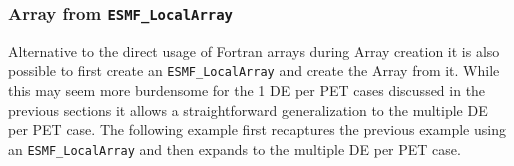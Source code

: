  
\setlength{\oldparskip}{\parskip}
\setlength{\parskip}{1.5ex}
\setlength{\oldparindent}{\parindent}
\setlength{\parindent}{0pt}
\setlength{\oldbaselineskip}{\baselineskip}
\setlength{\baselineskip}{11pt}
 
\def\bv{\begin{verbatim}}
\def\ev{\end{verbatim}}
\def\be{\begin{equation}}
\def\ee{\end{equation}}
\def\bea{\begin{eqnarray}}
\def\eea{\end{eqnarray}}
\def\bi{\begin{itemize}}
\def\ei{\end{itemize}}
\def\bn{\begin{enumerate}}
\def\en{\end{enumerate}}
\def\bd{\begin{description}}
\def\ed{\end{description}}
\def\({\left (}
\def\){\right )}
\def\[{\left [}
\def\]{\right ]}
\def\<{\left  \langle}
\def\>{\right \rangle}
\def\cI{{\cal I}}
\def\diag{\mathop{\rm diag}}
\def\tr{\mathop{\rm tr}}


 

   \subsubsection{Array from {\tt ESMF\_LocalArray}}
   \label{Array:LocalArray}
  
   \begin{sloppypar}
   Alternative to the direct usage of Fortran arrays during Array creation
   it is also possible to first create an {\tt ESMF\_LocalArray} and create the
   Array from it. While this may seem more burdensome for the 1 DE per PET cases
   discussed in the previous sections it allows a straightforward
   generalization to the multiple DE per PET case. The following example first
   recaptures the previous example using an {\tt ESMF\_LocalArray} and then
   expands to the multiple DE per PET case.
   \end{sloppypar} 

